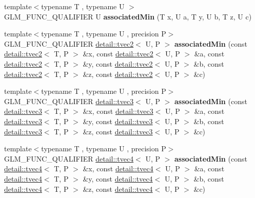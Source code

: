 \begin{DoxyCompactItemize}
\item 
{\footnotesize template$<$typename T , typename U $>$ }\\G\+L\+M\+\_\+\+F\+U\+N\+C\+\_\+\+Q\+U\+A\+L\+I\+F\+I\+ER U {\bfseries associated\+Min} (T x, U a, T y, U b, T z, U c)\hypertarget{namespaceglm_a7a59f677a5e4fc9274bc9ae72cd51c75}{}\label{namespaceglm_a7a59f677a5e4fc9274bc9ae72cd51c75}

\item 
{\footnotesize template$<$typename T , typename U , precision P$>$ }\\G\+L\+M\+\_\+\+F\+U\+N\+C\+\_\+\+Q\+U\+A\+L\+I\+F\+I\+ER \hyperlink{structglm_1_1detail_1_1tvec2}{detail\+::tvec2}$<$ U, P $>$ {\bfseries associated\+Min} (const \hyperlink{structglm_1_1detail_1_1tvec2}{detail\+::tvec2}$<$ T, P $>$ \&x, const \hyperlink{structglm_1_1detail_1_1tvec2}{detail\+::tvec2}$<$ U, P $>$ \&a, const \hyperlink{structglm_1_1detail_1_1tvec2}{detail\+::tvec2}$<$ T, P $>$ \&y, const \hyperlink{structglm_1_1detail_1_1tvec2}{detail\+::tvec2}$<$ U, P $>$ \&b, const \hyperlink{structglm_1_1detail_1_1tvec2}{detail\+::tvec2}$<$ T, P $>$ \&z, const \hyperlink{structglm_1_1detail_1_1tvec2}{detail\+::tvec2}$<$ U, P $>$ \&c)\hypertarget{namespaceglm_aa435fc5c6ffb758dfc2b9628d90da4f5}{}\label{namespaceglm_aa435fc5c6ffb758dfc2b9628d90da4f5}

\item 
{\footnotesize template$<$typename T , typename U , precision P$>$ }\\G\+L\+M\+\_\+\+F\+U\+N\+C\+\_\+\+Q\+U\+A\+L\+I\+F\+I\+ER \hyperlink{structglm_1_1detail_1_1tvec3}{detail\+::tvec3}$<$ U, P $>$ {\bfseries associated\+Min} (const \hyperlink{structglm_1_1detail_1_1tvec3}{detail\+::tvec3}$<$ T, P $>$ \&x, const \hyperlink{structglm_1_1detail_1_1tvec3}{detail\+::tvec3}$<$ U, P $>$ \&a, const \hyperlink{structglm_1_1detail_1_1tvec3}{detail\+::tvec3}$<$ T, P $>$ \&y, const \hyperlink{structglm_1_1detail_1_1tvec3}{detail\+::tvec3}$<$ U, P $>$ \&b, const \hyperlink{structglm_1_1detail_1_1tvec3}{detail\+::tvec3}$<$ T, P $>$ \&z, const \hyperlink{structglm_1_1detail_1_1tvec3}{detail\+::tvec3}$<$ U, P $>$ \&c)\hypertarget{namespaceglm_a71615041a85263b9e375eb82b65e7886}{}\label{namespaceglm_a71615041a85263b9e375eb82b65e7886}

\item 
{\footnotesize template$<$typename T , typename U , precision P$>$ }\\G\+L\+M\+\_\+\+F\+U\+N\+C\+\_\+\+Q\+U\+A\+L\+I\+F\+I\+ER \hyperlink{structglm_1_1detail_1_1tvec4}{detail\+::tvec4}$<$ U, P $>$ {\bfseries associated\+Min} (const \hyperlink{structglm_1_1detail_1_1tvec4}{detail\+::tvec4}$<$ T, P $>$ \&x, const \hyperlink{structglm_1_1detail_1_1tvec4}{detail\+::tvec4}$<$ U, P $>$ \&a, const \hyperlink{structglm_1_1detail_1_1tvec4}{detail\+::tvec4}$<$ T, P $>$ \&y, const \hyperlink{structglm_1_1detail_1_1tvec4}{detail\+::tvec4}$<$ U, P $>$ \&b, const \hyperlink{structglm_1_1detail_1_1tvec4}{detail\+::tvec4}$<$ T, P $>$ \&z, const \hyperlink{structglm_1_1detail_1_1tvec4}{detail\+::tvec4}$<$ U, P $>$ \&c)\hypertarget{namespaceglm_a18facea65271c205a884578e54d8670f}{}\label{namespaceglm_a18facea65271c205a884578e54d8670f}


\end{DoxyCompactItemize}
